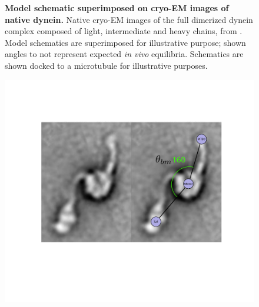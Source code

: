 \documentclass{article}
\begin{document}
\begin{figure}
\begin{minipage}{.3\textwidth}
   \label{fig:explengths}
 \end{minipage}
\caption{\textbf{Model schematic superimposed on cryo-EM images of native dynein.} Native cryo-EM images of the full dimerized dynein complex composed of light, intermediate and heavy chains, from \cite{nativestructure}. Model schematics are superimposed for illustrative purpose; shown angles to not represent expected \textit{in vivo} equilibria. Schematics are shown docked to a microtubule for illustrative purposes.}
\label{fig:modelparams}
\end{figure}

\begin{figure}%
\centering
 \begin{minipage}{0.5\textwidth}
   \centering
   \includegraphics[width=\linewidth]{figures/schematic-prestroke}
   \label{fig:prestrokeangle}
 \end{minipage}%
 \begin{minipage}{0.5\textwidth}
   \centering

\end{minipage}
\end{figure}
\end{document}
